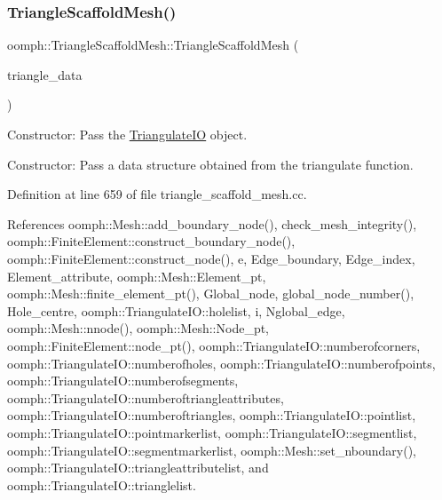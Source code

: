 \subsubsection{\texorpdfstring{Triangle\+Scaffold\+Mesh()}{TriangleScaffoldMesh()}\hspace{0.1cm}{\footnotesize\ttfamily [3/4]}}
{\footnotesize\ttfamily oomph\+::\+Triangle\+Scaffold\+Mesh\+::\+Triangle\+Scaffold\+Mesh (\begin{DoxyParamCaption}\item[{\hyperlink{structoomph_1_1TriangulateIO}{Triangulate\+IO} \&}]{triangle\+\_\+data }\end{DoxyParamCaption})}



Constructor\+: Pass the \hyperlink{structoomph_1_1TriangulateIO}{Triangulate\+IO} object. 

Constructor\+: Pass a data structure obtained from the triangulate function. 

Definition at line 659 of file triangle\+\_\+scaffold\+\_\+mesh.\+cc.



References oomph\+::\+Mesh\+::add\+\_\+boundary\+\_\+node(), check\+\_\+mesh\+\_\+integrity(), oomph\+::\+Finite\+Element\+::construct\+\_\+boundary\+\_\+node(), oomph\+::\+Finite\+Element\+::construct\+\_\+node(), e, Edge\+\_\+boundary, Edge\+\_\+index, Element\+\_\+attribute, oomph\+::\+Mesh\+::\+Element\+\_\+pt, oomph\+::\+Mesh\+::finite\+\_\+element\+\_\+pt(), Global\+\_\+node, global\+\_\+node\+\_\+number(), Hole\+\_\+centre, oomph\+::\+Triangulate\+I\+O\+::holelist, i, Nglobal\+\_\+edge, oomph\+::\+Mesh\+::nnode(), oomph\+::\+Mesh\+::\+Node\+\_\+pt, oomph\+::\+Finite\+Element\+::node\+\_\+pt(), oomph\+::\+Triangulate\+I\+O\+::numberofcorners, oomph\+::\+Triangulate\+I\+O\+::numberofholes, oomph\+::\+Triangulate\+I\+O\+::numberofpoints, oomph\+::\+Triangulate\+I\+O\+::numberofsegments, oomph\+::\+Triangulate\+I\+O\+::numberoftriangleattributes, oomph\+::\+Triangulate\+I\+O\+::numberoftriangles, oomph\+::\+Triangulate\+I\+O\+::pointlist, oomph\+::\+Triangulate\+I\+O\+::pointmarkerlist, oomph\+::\+Triangulate\+I\+O\+::segmentlist, oomph\+::\+Triangulate\+I\+O\+::segmentmarkerlist, oomph\+::\+Mesh\+::set\+\_\+nboundary(), oomph\+::\+Triangulate\+I\+O\+::triangleattributelist, and oomph\+::\+Triangulate\+I\+O\+::trianglelist.

\mbox{\label{classoomph_1_1TriangleScaffoldMesh_a74c8487ad1f0bf76cea7b34f1f8af0cd}} 
